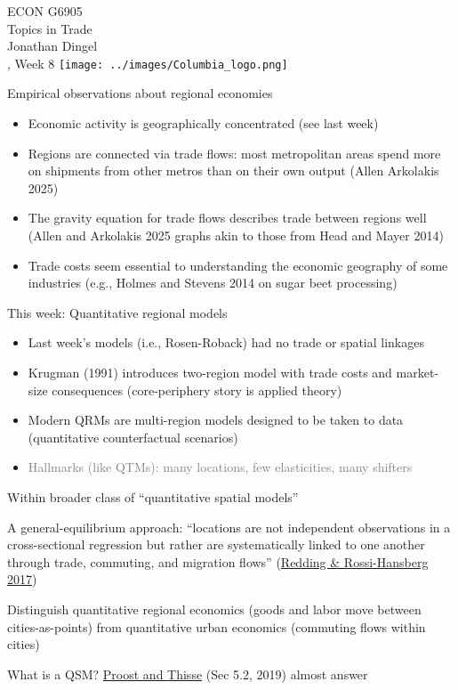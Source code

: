 \documentclass[11pt,notes=hide,aspectratio=169]{beamer}
\begin{document}
\begin{frame}[plain]
\begin{center}
\large
\textcolor{columbiadarkblue}{ECON G6905\\
Topics in Trade\\ 
Jonathan Dingel\\
\semester, Week 8}
\vfill 
\texttt{[image: ../images/Columbia\_logo.png]}
\end{center}
\end{frame}
\begin{frame}{Empirical observations about regional economies}
\begin{itemize}
\item Economic activity is geographically concentrated (see last week) 
\item Regions are connected via trade flows: most metropolitan areas spend more on shipments from other metros than on their own output (Allen Arkolakis 2025)
\item The gravity equation for trade flows describes trade between regions well (Allen and Arkolakis 2025 graphs akin to those from Head and Mayer 2014)
\item Trade costs seem essential to understanding the economic geography of some industries (e.g., Holmes and Stevens 2014 on sugar beet processing)
\end{itemize}
\end{frame}
\begin{frame}{This week: Quantitative regional models}
\begin{itemize}
\item Last week's models (i.e., Rosen-Roback) had no trade or spatial linkages
\item Krugman (1991) introduces two-region model with trade costs and market-size consequences (core-periphery story is applied theory)
\item Modern QRMs are multi-region models designed to be taken to data (quantitative counterfactual scenarios)
\item[] \textcolor{gray}{Hallmarks (like QTMs): many locations, few elasticities, many shifters}
\end{itemize}
Within broader class of ``quantitative spatial models''
\begin{itemize}{\small
\item A general-equilibrium approach:
``locations are not independent observations in a cross-sectional regression but rather are systematically linked to one another through trade, commuting, and migration flows'' (\href{https://doi.org/10.1146/annurev-economics-063016-103713}{Redding \& Rossi-Hansberg 2017})
\item Distinguish quantitative regional economics (goods and labor move between cities-as-points)
from
quantitative urban economics (commuting flows within cities)
\item What is a QSM? \href{https://www.aeaweb.org/articles?id=10.1257/jel.20181414}{Proost and Thisse} (Sec 5.2, 2019) almost answer
\par}\end{itemize}
\end{frame}
\end{document}
